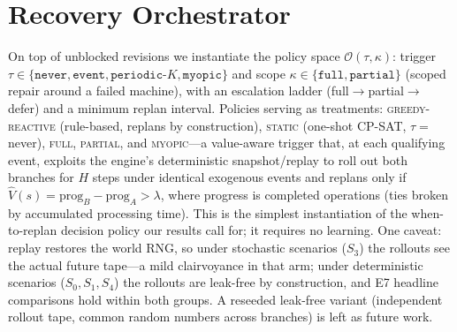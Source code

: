 \documentclass[twocolumn]{article}
\begin{document}
\section{Recovery Orchestrator}
On top of unblocked revisions we instantiate the policy space
$\mathcal{O}(\tau,\kappa)$: trigger
$\tau\in\{\texttt{never},\texttt{event},\texttt{periodic-}K,
\texttt{myopic}\}$ and scope
$\kappa\in\{\texttt{full},\texttt{partial}\}$ (scoped repair around a
failed machine), with an escalation ladder (full$\to$partial$\to$defer)
and a minimum replan interval. Policies serving as treatments:
\textsc{greedy-reactive} (rule-based, replans by construction),
\textsc{static} (one-shot CP-SAT, $\tau{=}$never), \textsc{full},
\textsc{partial}, and \textsc{myopic}---a value-aware trigger that, at
each qualifying event, exploits the engine's deterministic
snapshot/replay to roll out both branches for $H$ steps under identical
exogenous events and replans only if
$\hat V(s)=\mathrm{prog}_B-\mathrm{prog}_A>\lambda$, where progress is
completed operations (ties broken by accumulated processing time). This
is the simplest instantiation of the when-to-replan decision policy our
results call for; it requires no learning. One caveat: replay restores
the world RNG, so under stochastic scenarios ($S_3$) the rollouts see
the actual future tape---a mild clairvoyance in that arm; under
deterministic scenarios ($S_0,S_1,S_4$) the rollouts are leak-free by
construction, and E7 headline comparisons hold within both groups. A
reseeded leak-free variant (independent rollout tape, common random
numbers across branches) is left as future work.
\end{document}
